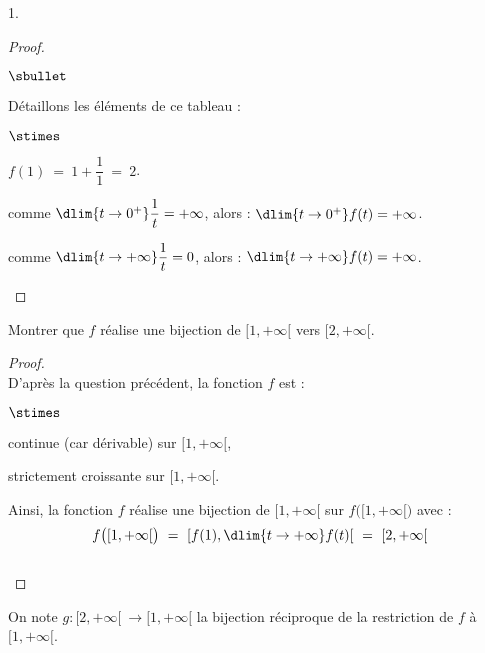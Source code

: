 \documentclass[11pt]{article}%
\begin{document}
\begin{noliste}{1.}
\begin{proof}
\begin{noliste}{$\sbullet$}
    \item Détaillons les éléments de ce tableau :
      \begin{noliste}{$\stimes$}
      \item $f(1) \ = \ 1+ \dfrac{1}{1} \ = \ 2$.
        
      \item comme $\dlim{t\to 0^+} \dfrac{1}{t} = +\infty$, alors :
        $\dlim{t\to 0^+} f(t) = +\infty$.
        
      \item comme $\dlim{t\to +\infty} \dfrac{1}{t} = 0$, alors :
        $\dlim{t\to +\infty} f(t) = +\infty$.
      \end{noliste}
    \end{noliste}
  \end{proof}


  \newpage
  
  
\item Montrer que $f$ réalise une bijection de $[1,+\infty[$ vers
  $[2,+\infty[$.
  \begin{proof}~\\
    D'après la question précédent, la fonction $f$ est :
    \begin{noliste}{$\stimes$}
    \item continue (car dérivable) sur $[1,+\infty[$,
      
    \item strictement croissante sur $[1,+\infty[$.
    \end{noliste}
    Ainsi, la fonction $f$ réalise une bijection de $[1,+\infty[$ sur
    $f\big([1, +\infty[\big)$ avec :
    \[
      f\big([1, +\infty[\big) \ = \ \left[ f(1), \dlim{t\to +\infty}
        f(t) \right[ \ = \ [2,+\infty[
    \]
    \conc{Finalement, la fonction $f$ réalise une bijection de
      $[1,+\infty[$ sur $[2,+\infty[$.}~\\[-1cm]
  \end{proof}
\end{noliste}
On note $g : [2,+\infty[ \ \to [1,+\infty[$ la bijection réciproque de
la restriction de $f$ à $[1,+\infty[$.
\end{document}
